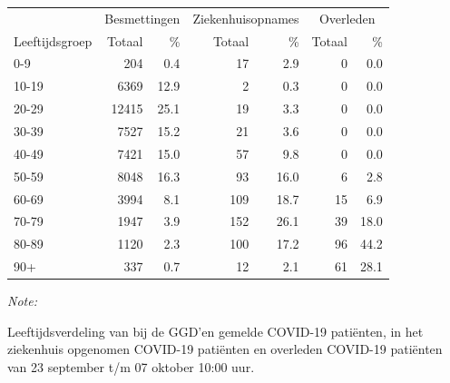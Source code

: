 \documentclass[
  english,
  man,floatsintext]{apa6}
\begin{document}
\begin{table}[H]
\centering\begingroup\fontsize{11}{13}\selectfont

\begin{threeparttable}
\begin{tabular}{lrrrrrr}
\toprule
\multicolumn{1}{c}{ } & \multicolumn{2}{c}{Besmettingen} & \multicolumn{2}{c}{Ziekenhuisopnames} & \multicolumn{2}{c}{Overleden} \\
\cmidrule(l{3pt}r{3pt}){2-3} \cmidrule(l{3pt}r{3pt}){4-5} \cmidrule(l{3pt}r{3pt}){6-7}
Leeftijdsgroep & Totaal & \% & Totaal & \% & Totaal & \%\\
\midrule
0-9 & 204 & 0.4 & 17 & 2.9 & 0 & 0.0\\
10-19 & 6369 & 12.9 & 2 & 0.3 & 0 & 0.0\\
20-29 & 12415 & 25.1 & 19 & 3.3 & 0 & 0.0\\
30-39 & 7527 & 15.2 & 21 & 3.6 & 0 & 0.0\\
40-49 & 7421 & 15.0 & 57 & 9.8 & 0 & 0.0\\
50-59 & 8048 & 16.3 & 93 & 16.0 & 6 & 2.8\\
60-69 & 3994 & 8.1 & 109 & 18.7 & 15 & 6.9\\
70-79 & 1947 & 3.9 & 152 & 26.1 & 39 & 18.0\\
80-89 & 1120 & 2.3 & 100 & 17.2 & 96 & 44.2\\
90+ & 337 & 0.7 & 12 & 2.1 & 61 & 28.1\\
\bottomrule
\end{tabular}
\begin{tablenotes}
\item \textit{Note: } 
\item Leeftijdsverdeling van bij de GGD’en gemelde COVID-19 patiënten, in het ziekenhuis opgenomen COVID-19 patiënten en overleden COVID-19 patiënten van 23 september t/m 07 oktober 10:00 uur.
\end{tablenotes}
\end{threeparttable}
\endgroup{}
\end{table}
\end{document}
